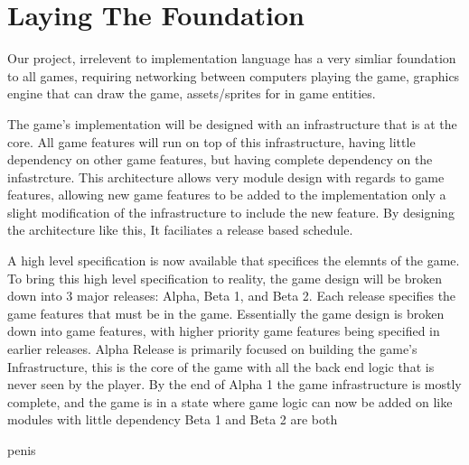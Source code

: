 
\begin{comment}
  what to do what to do what to do.
  In this section should talk about what we did for our infrastructure, what decisions we made, what we thought we would need to factor in later on.
  
things to talk about:
  - what is infrastructure
  - why infrastructure is soo important
    - it is the skelenton of the program
    - once infrastructure is in place, it defines what is easy to change, and what can't change without major refactor
  - infrastructure components
    - networking
    - gameploop
    - how the server and client synchronize
    - graphics
\end{comment}
    
\section{Laying The Foundation}

Our project, irrelevent to implementation language has a very simliar foundation to all games, requiring networking between computers playing the game, graphics engine that can draw the game, assets/sprites for in game entities.

The game's implementation will be designed with an infrastructure that is at the core. All game features will run on top of this infrastructure, having little dependency on other game features, but having complete dependency on the infastrcture. This architecture allows very module design with regards to game features, allowing new game features to be added to the implementation only a slight modification of the infrastructure to include the new feature. By designing the architecture like this, It faciliates a release based schedule.

A high level specification is now available that specifices the elemnts of the game. To bring this high level specification to reality, the game design will be broken down into 3 major releases: Alpha, Beta 1, and Beta 2. Each release specifies the game features that must be in the game. Essentially the game design is broken down into game features, with higher priority game features being specified in earlier releases.
Alpha Release is primarily focused on building the game's Infrastructure, this is the core of the game with all the back end logic that is never seen by the player. By the end of Alpha 1 the game infrastructure is mostly complete, and the game is in a state where game logic can now be added on like modules with little dependency 
Beta 1 and Beta 2 are both 

 
penis